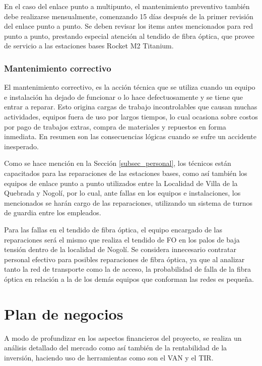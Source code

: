 \documentclass[12pt,a4paper]{book}
\begin{document}
En el caso del enlace punto a multipunto, el mantenimiento preventivo también debe realizarse mensualmente, comenzando 15 días después de la primer revisión del enlace punto a punto. Se deben revisar los items antes mencionados para red punto a punto, prestando especial atención al tendido de fibra óptica, que provee de servicio a las estaciones bases Rocket M2 Titanium. 

\subsection{Mantenimiento correctivo}

El mantenimiento correctivo, es la acción técnica que se utiliza cuando un equipo e instalación ha dejado de funcionar o lo hace defectuosamente y se tiene que entrar a reparar.
Esto origina cargas de trabajo incontrolables que causan muchas actividades, equipos fuera de uso por largos tiempos, lo cual ocasiona sobre costos por pago de trabajos extras, compra de materiales y repuestos en forma inmediata. En resumen son las consecuencias lógicas cuando se sufre un accidente inesperado.

Como se hace mención en la Sección \ref{subsec_personal}, los técnicos están capacitados para las reparaciones de las estaciones bases, como así también los equipos de enlace punto a punto utilizados entre la Localidad de Villa de la Quebrada y Nogolí, por lo cual, ante fallas en los equipos e instalaciones, los mencionados se harán cargo de las reparaciones, utilizando un sistema de turnos de guardia entre los empleados. 

Para las fallas en el tendido de fibra óptica, el equipo encargado de las reparaciones será el mismo que realiza el tendido de FO en los palos de baja tensión dentro de la localidad de Nogolí. Se considera innecesario contratar personal efectivo para posibles reparaciones de fibra óptica, ya que al analizar tanto la red de transporte como la de acceso, la probabilidad de falla de la fibra óptica en relación a la de los demás equipos que conforman las redes es pequeña.



\chapter{Plan de negocios}\label{cap_plan_de_negocios}
A modo de profundizar en los aspectos financieros del proyecto, se realiza un análisis detallado del mercado como así también de la rentabilidad de la inversión, haciendo uso de herramientas como son el VAN y el TIR.
\end{document}
